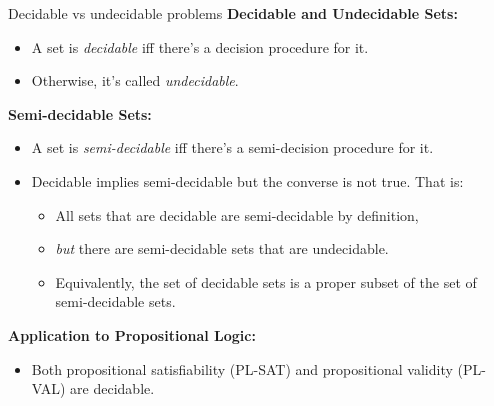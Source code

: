 \documentclass[style=sailor,size=12pt]{powerdot}
\begin{document}
\begin{wideslide}[bm=,toc=]{Decidable vs undecidable problems}
\textbf{Decidable and Undecidable Sets:}
\begin{itemize}
\item<2-> A set is {\em decidable\/} iff there's a decision procedure for it.
\item<3-> Otherwise, it's called {\em undecidable}.
\end{itemize}
\pause[3]
\textbf{Semi-decidable Sets:}
\begin{itemize}
\item<5-> A set is {\em semi-decidable\/} iff there's a semi-decision procedure for it.
\item<6-> Decidable implies semi-decidable but the converse is not true. That is:
\begin{itemize}
\item<7-> All sets that are decidable are semi-decidable by definition,
\item<8-> \emph{but} there are semi-decidable sets that are undecidable.
\item<9-> Equivalently, the set of decidable sets is a proper subset of the set of
semi-decidable sets. 
\end{itemize}
\end{itemize}
\pause[6] \textbf{Application to Propositional Logic:}
\begin{itemize}
\item<11-> Both propositional satisfiability (PL-SAT) and propositional validity (PL-VAL) are decidable.
\end{itemize}
\end{wideslide}
\end{document}
